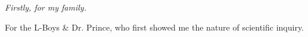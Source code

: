 {
\centering
\it Firstly, for my family.

For the L-Boys
\& Dr. Prince, who first showed me the nature of scientific inquiry.
\par
}

\vspace{0.25\textheight}



